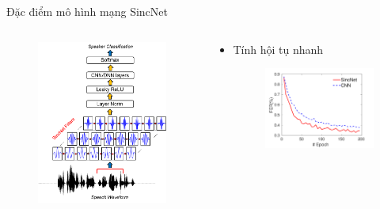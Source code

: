 \documentclass[11pt]{beamer}
\begin{document}
\begin{frame}{Đặc điểm mô hình mạng SincNet}
	\begin{columns}
		\begin{column}{0.47\textwidth}
			\begin{figure}[H]
				\includegraphics[width=0.9\linewidth]{images/SincNet.png}
			\end{figure}
		\end{column}
		\begin{column}{0.5\textwidth}
		\begin{itemize}
			\item Tính hội tụ nhanh
			\begin{figure}[H]
				\includegraphics[width=0.9\linewidth]{images/fast_convergence.png}
			\end{figure}
		\end{itemize}
		\end{column}
	\end{columns}
\end{frame}
\end{document}
